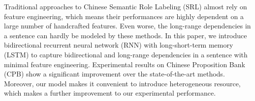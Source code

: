 Traditional approaches to Chinese Semantic Role Labeling (SRL) almost rely on feature engineering, which means their performances are highly dependent on a large number of handcrafted features. Even worse, the long-range dependencies in a sentence can hardly be modeled by these methods. In this paper, we introduce bidirectional recurrent neural network (RNN) with long-short-term memory (LSTM) to capture bidirectional and long-range dependencies in a sentence with minimal feature engineering. Experimental results on Chinese Proposition Bank (CPB) show a significant improvement over the state-of-the-art methods. Moreover, our model makes it convenient to introduce heterogeneous resource, which makes a further improvement to our experimental performance.
